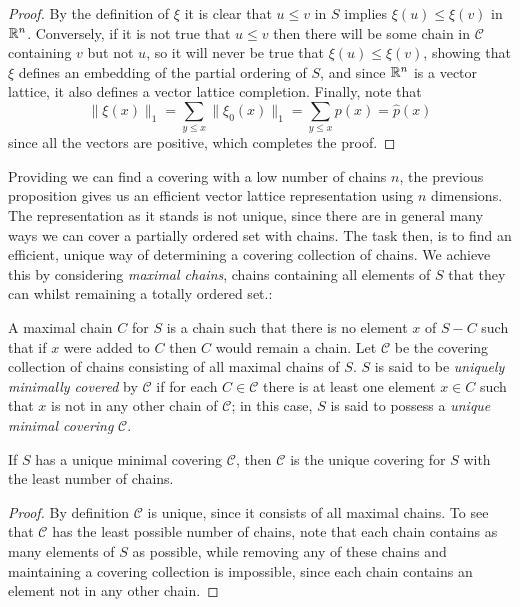 \documentclass{report}
\begin{document}
\begin{proof}
By the definition of $\xi$ it is clear that $u \le v$ in $S$ implies $\xi(u) \le \xi (v)$ in $\mathbb{R}^n$. Conversely, if it is not true that $u \le v$ then there will be some chain in $\mathcal{C}$ containing $v$ but not $u$, so it will never be true that $\xi(u) \le \xi(v)$, showing that $\xi$ defines an embedding of the partial ordering of $S$, and since $\mathbb{R}^n$ is a vector lattice, it also defines a vector lattice completion. Finally, note that
$$\|\xi(x)\|_1 = \sum_{y\le x} \|\xi_0(x)\|_1 = \sum_{y \le x} p(x) = \hat{p}(x)$$
since all the vectors are positive, which completes the proof.
\end{proof}

Providing we can find a covering with a low number of chains $n$, the previous proposition gives us an efficient vector lattice representation using $n$ dimensions. The representation as it stands is not unique, since there are in general many ways we can cover a partially ordered set with chains. The task then, is to find an efficient, unique way of determining a covering collection of chains. We achieve this by considering \emph{maximal chains}, chains containing all elements of $S$ that they can whilst remaining a totally ordered set.:

\begin{defn}
A maximal chain $C$ for $S$ is a chain such that there is no element $x$ of $S - C$ such that if $x$ were added to $C$ then $C$ would remain a chain. Let $\mathcal{C}$ be the covering collection of chains consisting of all maximal chains of $S$. $S$ is said to be \emph{uniquely minimally covered} by $\mathcal{C}$ if for each $C \in \mathcal{C}$ there is at least one element $x \in C$ such that $x$ is not in any other chain of $\mathcal{C}$; in this case, $S$ is said to possess a \emph{unique minimal covering} $\mathcal{C}$.
\end{defn}

\begin{prop}
If $S$ has a unique minimal covering $\mathcal{C}$, then $\mathcal{C}$ is the unique covering for $S$ with the least number of chains.
\end{prop}
\begin{proof}
By definition $\mathcal{C}$ is unique, since it consists of all maximal chains. To see that $\mathcal{C}$ has the least possible number of chains, note that each chain contains as many elements of $S$ as possible, while removing any of these chains and maintaining a covering collection is impossible, since each chain contains an element not in any other chain.
\end{proof}
\end{document}
